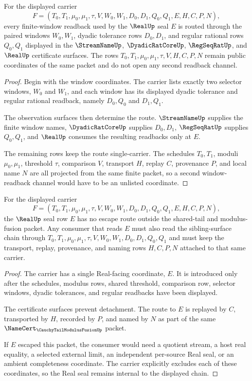 \begin{theorem}
\label{thm:cauchy-tail-modulus-fusion-window-readback-route}
For the displayed carrier
$$
F=(T_0,T_1,\mu_0,\mu_1,\tau,V,W_0,W_1,D_0,D_1,Q_0,Q_1,E,H,C,P,N),
$$
every finite-window readback used by the $\RealUp$ seal $E$ is routed through the paired windows $W_0,W_1$, dyadic tolerance rows $D_0,D_1$, and regular rational rows $Q_0,Q_1$ displayed in the $\StreamNameUp$, $\DyadicRatCoreUp$, $\RegSeqRatUp$, and $\RealUp$ certificate surfaces. The rows $T_0,T_1,\mu_0,\mu_1,\tau,V,H,C,P,N$ remain public coordinates of the same packet and do not open any second readback channel.
\end{theorem}
\begin{proof}
Begin with the window coordinates. The carrier lists exactly two selector windows, $W_0$ and $W_1$, and each window has its displayed dyadic tolerance and regular rational readback, namely $D_0,Q_0$ and $D_1,Q_1$.

The observation surfaces then determine the route. $\StreamNameUp$ supplies the finite window names, $\DyadicRatCoreUp$ supplies $D_0,D_1$, $\RegSeqRatUp$ supplies $Q_0,Q_1$, and $\RealUp$ consumes the resulting readbacks only at $E$.

The remaining rows keep the route single-carrier. The schedules $T_0,T_1$, moduli $\mu_0,\mu_1$, threshold $\tau$, comparison $V$, transport $H$, replay $C$, provenance $P$, and local name $N$ are all projected from the same finite packet, so a second window-readback channel would have to be an unlisted coordinate.
\end{proof}

\begin{theorem}
\label{thm:cauchy-tail-modulus-fusion-real-seal-nonescape}
For the displayed carrier
$$
F=(T_0,T_1,\mu_0,\mu_1,\tau,V,W_0,W_1,D_0,D_1,Q_0,Q_1,E,H,C,P,N),
$$
the $\RealUp$ seal row $E$ has no escape route outside the shared-tail and modulus-fusion packet. Any consumer that reads $E$ must also read the sibling-surface chain through $T_0,T_1,\mu_0,\mu_1,\tau,V,W_0,W_1,D_0,D_1,Q_0,Q_1$ and must keep the transport, replay, provenance, and naming rows $H,C,P,N$ attached to that same carrier.
\end{theorem}
\begin{proof}
The carrier has a single Real-facing coordinate, $E$. It is introduced only after the schedules, modulus rows, shared threshold, comparison row, selector windows, dyadic tolerances, and regular readbacks have been displayed.

The certificate surfaces prevent detachment. The route to $E$ is replayed by $C$, transported by $H$, recorded by $P$, and named by $N$ as part of the same $\NameCert_{\CauchyTailModulusFusionUp}$ packet.

If $E$ escaped this packet, the consumer would need a quotient stream, a host real equality, a selected external limit, an independent per-source Real seal, or an ambient completeness coordinate. The carrier explicitly excludes each of these coordinates, so the Real seal remains internal to the displayed chain.
\end{proof}


